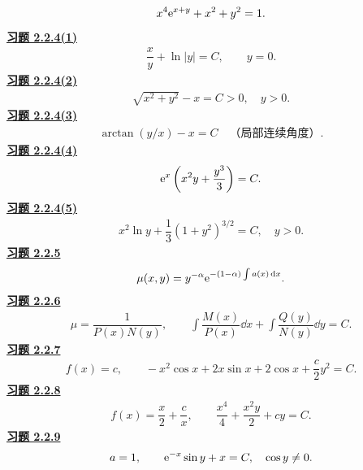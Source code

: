 \[\begin{gathered}x^4\mathrm e^{x+y}+x^2+y^2=1.\end{gathered}\]
\noindent\textbf{\hyperref[q:2.2.4(1)]{习题 2.2.4(1)}}
\[\begin{gathered}\dfrac xy+\ln|y|=C,\qquad y=0.\end{gathered}\]
\noindent\textbf{\hyperref[q:2.2.4(2)]{习题 2.2.4(2)}}
\[\begin{gathered}\sqrt{x^2+y^2}-x=C>0,\quad y>0.\end{gathered}\]
\noindent\textbf{\hyperref[q:2.2.4(3)]{习题 2.2.4(3)}}
\[\begin{gathered}\arctan(y/x)-x=C\quad\text{（局部连续角度）}.\end{gathered}\]
\noindent\textbf{\hyperref[q:2.2.4(4)]{习题 2.2.4(4)}}
\[\begin{gathered}\mathrm e^x\left(x^2y+\dfrac{y^3}{3}\right)=C.\end{gathered}\]
\noindent\textbf{\hyperref[q:2.2.4(5)]{习题 2.2.4(5)}}
\[\begin{gathered}x^2\ln y+\dfrac13(1+y^2)^{3/2}=C,\quad y>0.\end{gathered}\]
\noindent\textbf{\hyperref[q:2.2.5]{习题 2.2.5}}
\[\begin{gathered}\mu(x,y)=y^{-\alpha}\mathrm e^{-(1-\alpha)\int a(x)\,\mathrm d x}.\end{gathered}\]
\noindent\textbf{\hyperref[q:2.2.6]{习题 2.2.6}}
\[\begin{gathered}\mu=\dfrac1{P(x)N(y)},\qquad
 \int\dfrac{M(x)}{P(x)}\dd x+\int\dfrac{Q(y)}{N(y)}\dd y=C.\end{gathered}\]
\noindent\textbf{\hyperref[q:2.2.7]{习题 2.2.7}}
\[\begin{gathered}f(x)=c,\qquad -x^2\cos x+2x\sin x+2\cos x+\dfrac c2y^2=C.\end{gathered}\]
\noindent\textbf{\hyperref[q:2.2.8]{习题 2.2.8}}
\[\begin{gathered}f(x)=\dfrac x2+\dfrac cx,\qquad
 \dfrac{x^4}{4}+\dfrac{x^2y}{2}+cy=C.\end{gathered}\]
\noindent\textbf{\hyperref[q:2.2.9]{习题 2.2.9}}
\[\begin{gathered}a=1,\qquad \mathrm e^{-x}\sin y+x=C,\quad\cos y\ne0.\end{gathered}\]

